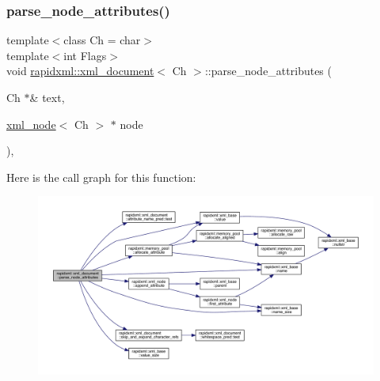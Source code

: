 \subsubsection{\texorpdfstring{parse\_node\_attributes()}{parse\_node\_attributes()}}
{\footnotesize\ttfamily template$<$class Ch = char$>$ \\
template$<$int Flags$>$ \\
void \mbox{\hyperlink{classrapidxml_1_1xml__document}{rapidxml\+::xml\+\_\+document}}$<$ Ch $>$\+::parse\+\_\+node\+\_\+attributes (\begin{DoxyParamCaption}\item[{Ch $\ast$\&}]{text,  }\item[{\mbox{\hyperlink{classrapidxml_1_1xml__node}{xml\+\_\+node}}$<$ Ch $>$ $\ast$}]{node }\end{DoxyParamCaption})\hspace{0.3cm}{\ttfamily [inline]}, {\ttfamily [private]}}

Here is the call graph for this function\+:\nopagebreak
\begin{figure}[H]
\begin{center}
\leavevmode
\includegraphics[width=350pt]{classrapidxml_1_1xml__document_ac0b3cd07b3d5cbaa83762a196c681519_cgraph}
\end{center}
\end{figure}
\mbox{\label{classrapidxml_1_1xml__document_aae0a4c2e1972ab9a9e0ce91cf1166ac9}} 

